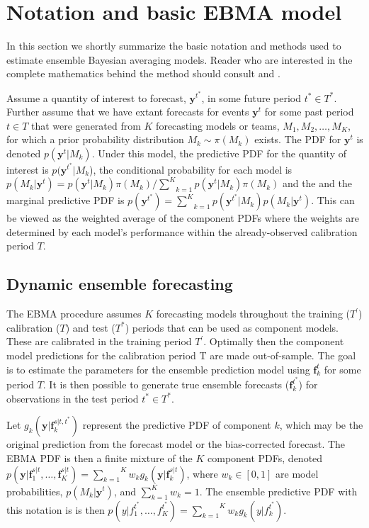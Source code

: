 \documentclass[12pt,fullpage,endnotes]{article}
\begin{document}
\section{Notation and basic EBMA model} 
\label{model}
In this section we shortly summarize the basic notation and methods used to estimate ensemble Bayesian averaging models. Reader who are interested in the complete mathematics behind the method should consult \citet{mhw:2012} and \citet{Raftery:2005}.

Assume a quantity of interest to forecast, $\mathbf{y}^{t^*}$, in some
future period $t^\ast \in T^\ast$.  Further assume that we have extant
forecasts for events $\mathbf{y}^t$ for some past period $t \in T$
that were generated from $K$ forecasting models or teams, $M_1, M_2,
\ldots, M_K$, for which a prior probability distribution $M_k\sim
\pi(M_k)$ exists. The PDF for $\mathbf{y}^t$ is denoted
$p(\mathbf{y}^t|M_k)$.  Under this model, the predictive PDF for the
quantity of interest is $p(\mathbf{y}^{t^*}|M_k$), the conditional
probability for each model is $p(M_k|\mathbf{y}^t) =
p(\mathbf{y}^t|M_k)\pi(M_k)/\underset{k=1}{\overset{K}{\sum}}p(\mathbf{y}^t|M_k)\pi(M_k)$
and the and the marginal predictive PDF is $p(\mathbf{y}^{t^*}) =
\underset{k=1}{\overset{K}{\sum}}
p(\mathbf{y}^{t^*}|M_k)p(M_k|\mathbf{y}^{t})$.  This can be viewed as
the weighted average of the component PDFs where the weights are
determined by each model's performance within the already-observed calibration
period $T$.

\subsection{Dynamic ensemble forecasting}

The EBMA procedure assumes $K$ forecasting models throughout the training
($T^{\prime}$) calibration ($T$) and test ($T^\ast$) periods that can be used as component models. These are calibrated in the training period $T^\prime$. Optimally then the component model predictions for the calibration period T are made out-of-sample. The goal is
to estimate the parameters for the ensemble prediction model using
$\mathbf{f}^{t}_k$ for some period $T$.  It is then possible to
generate true ensemble forecasts ($\mathbf{f}_k^{t^\ast}$) for
observations in the test period $t^\ast \in T^*$.

Let $g_k(\mathbf{y}|\mathbf{f}_k^{s|t, t^\ast})$ represent the
predictive PDF of component $k$, which may be the original prediction
from the forecast model or the bias-corrected forecast.  The EBMA PDF
is then a finite mixture of the $K$ component PDFs, denoted
$p(\mathbf{y}|\mathbf{f}_1^{s|t}, \ldots,
\mathbf{f}_K^{s|t})=\overset{K}{\underset{k=1}{\sum}} w_k
g_k(\mathbf{y}|\mathbf{f}_k^{s|t})$, where $w_k \in [0,1]$ are model
probabilities, $p(M_k|\mathbf{y}^t)$, and $\sum_{k=1}^Kw_k=1$. The
ensemble predictive PDF with this notation is is then
$p(y|f_{1}^{t^\ast}, \ldots,
f_{K}^{t^\ast})=\overset{K}{\underset{k=1}{\sum}} w_k
g_k(y|f_{k}^{t^*})$.
\end{document}
